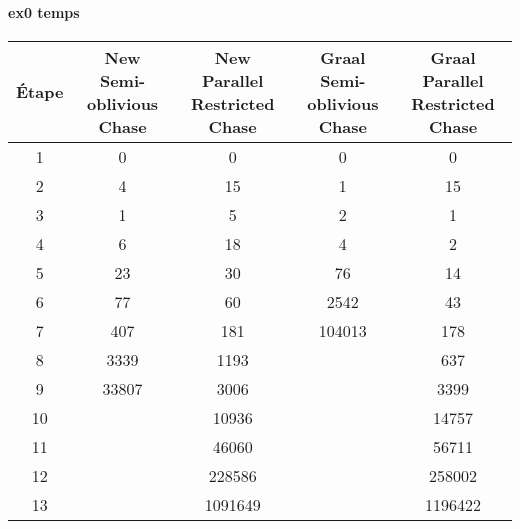 \paragraph{ex0 temps}
\begin{center}
\begin{tabular}{|c||c|c|c|c|}
    \hline
    Étape & \shortstack{New \\ Semi-oblivious Chase} & \shortstack{New \\ Parallel Restricted Chase} & \shortstack{Graal \\ Semi-oblivious Chase} & \shortstack{Graal \\ Parallel Restricted Chase} \\
    \hline
     \hline
    1 & 0 & 0 & 0 & 0 \\ 
     \hline
    2 & 4 & 15 & 1 & 15 \\ 
    \hline
    3 & 1 & 5 & 2 & 1 \\ 
    \hline
    4 & 6 & 18 & 4 & 2 \\ 
    \hline
    5 & 23 & 30 & 76 & 14 \\ 
     \hline
    6 & 77 & 60 & 2542 & 43 \\ 
    \hline
    7 & 407 & 181 & 104013 & 178 \\ 
    \hline
    8 & 3339 & 1193 &  & 637 \\ 
    \hline
    9 & 33807 & 3006 &  & 3399 \\ 
    \hline
    10 &  & 10936 &  & 14757 \\ 
    \hline
    11 &  & 46060 &  & 56711 \\ 
     \hline
    12 &  & 228586 &  & 258002 \\ 
    \hline
    13 &  & 1091649 &  & 1196422 \\ 
     \hline
\end{tabular}
\end{center}

